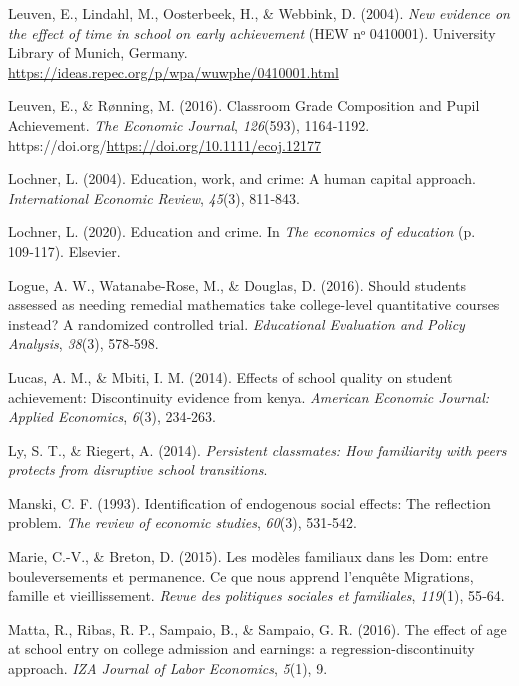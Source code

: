 \documentclass[
]{book}
\newlength{\cslhangindent}
\newlength{\cslentryspacingunit} %
\newenvironment{CSLReferences}[2] %
 {%
  \setlength{\parindent}{0pt}
  \ifodd #1
  \let\oldpar\par
  \def\par{\hangindent=\cslhangindent\oldpar}
  \fi
  \setlength{\parskip}{#2\cslentryspacingunit}
 }%
 {}
\begin{document}
\begin{CSLReferences}{1}{2}
\leavevmode{}%
Leuven, E., Lindahl, M., Oosterbeek, H., \& Webbink, D. (2004). \emph{{New evidence on the effect of time in school on early achievement}} (HEW nᵒ 0410001). University Library of Munich, Germany. \url{https://ideas.repec.org/p/wpa/wuwphe/0410001.html}

\leavevmode{}%
Leuven, E., \& Rønning, M. (2016). Classroom Grade Composition and Pupil Achievement. \emph{The Economic Journal}, \emph{126}(593), 1164‑1192. https://doi.org/\url{https://doi.org/10.1111/ecoj.12177}

\leavevmode{}%
Lochner, L. (2004). Education, work, and crime: A human capital approach. \emph{International Economic Review}, \emph{45}(3), 811‑843.

\leavevmode{}%
Lochner, L. (2020). Education and crime. In \emph{The economics of education} (p. 109‑117). Elsevier.

\leavevmode{}%
Logue, A. W., Watanabe-Rose, M., \& Douglas, D. (2016). Should students assessed as needing remedial mathematics take college-level quantitative courses instead? A randomized controlled trial. \emph{Educational Evaluation and Policy Analysis}, \emph{38}(3), 578‑598.

\leavevmode{}%
Lucas, A. M., \& Mbiti, I. M. (2014). Effects of school quality on student achievement: Discontinuity evidence from kenya. \emph{American Economic Journal: Applied Economics}, \emph{6}(3), 234‑263.

\leavevmode{}%
Ly, S. T., \& Riegert, A. (2014). \emph{Persistent classmates: How familiarity with peers protects from disruptive school transitions}.

\leavevmode{}%
Manski, C. F. (1993). Identification of endogenous social effects: The reflection problem. \emph{The review of economic studies}, \emph{60}(3), 531‑542.

\leavevmode{}%
Marie, C.-V., \& Breton, D. (2015). Les modèles familiaux dans les Dom: entre bouleversements et permanence. Ce que nous apprend l'enquête Migrations, famille et vieillissement. \emph{Revue des politiques sociales et familiales}, \emph{119}(1), 55‑64.

\leavevmode{}%
Matta, R., Ribas, R. P., Sampaio, B., \& Sampaio, G. R. (2016). The effect of age at school entry on college admission and earnings: a regression-discontinuity approach. \emph{IZA Journal of Labor Economics}, \emph{5}(1), 9.


\end{CSLReferences}
\end{document}
